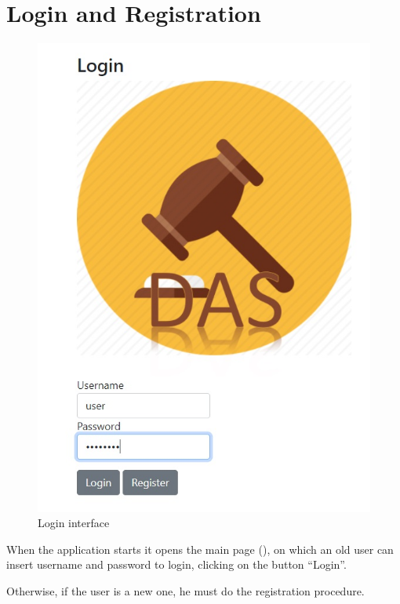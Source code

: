 \section{Login and Registration}\label{sec:manuallogin}

\begin{figure}[htb]
	\centering
	\includegraphics[width=\textwidth]{img/login.jpg}
	\caption{Login interface}\label{fig:login}
\end{figure}

When the application starts it opens the main page (), on
which an old user can insert username and password to login, clicking on the
button ``Login''.

Otherwise, if the user is a new one, he must do the registration procedure.


